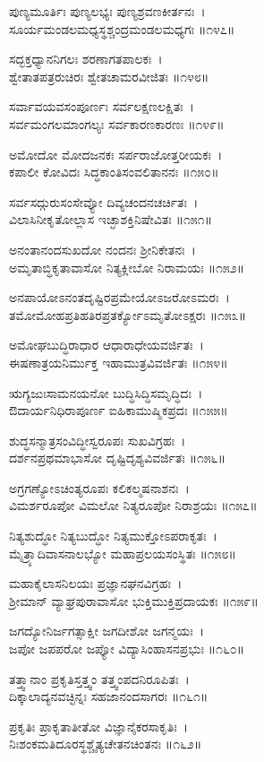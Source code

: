 ಪುಣ್ಯಮೂರ್ತಿಃ ಪುಣ್ಯಲಭ್ಯಃ ಪುಣ್ಯಶ್ರವಣಕೀರ್ತನಃ~।\\
ಸೂರ್ಯಮಂಡಲಮಧ್ಯಸ್ಥಶ್ಚಂದ್ರಮಂಡಲಮಧ್ಯಗಃ ॥೧೪೭॥

	ಸದ್ಭಕ್ತಧ್ಯಾನನಿಗಲಃ ಶರಣಾಗತಪಾಲಕಃ~।\\
	ಶ್ವೇತಾತಪತ್ರರುಚಿರಃ ಶ್ವೇತಚಾಮರವೀಜಿತಃ ॥೧೪೮॥

ಸರ್ವಾವಯವಸಂಪೂರ್ಣಃ ಸರ್ವಲಕ್ಷಣಲಕ್ಷಿತಃ~।\\
ಸರ್ವಮಂಗಲಮಾಂಗಲ್ಯಃ ಸರ್ವಕಾರಣಕಾರಣಃ ॥೧೪೯॥

	ಅಮೋದೋ ಮೋದಜನಕಃ ಸರ್ಪರಾಜೋತ್ತರೀಯಕಃ~।\\
	ಕಪಾಲೀ ಕೋವಿದಃ ಸಿದ್ಧಕಾಂತಿಸಂವಲಿತಾನನಃ ॥೧೫೦॥

ಸರ್ವಸದ್ಗುರುಸಂಸೇವ್ಯೋ ದಿವ್ಯಚಂದನಚರ್ಚಿತಃ~।\\
ವಿಲಾಸಿನೀಕೃತೋಲ್ಲಾಸ ಇಚ್ಛಾಶಕ್ತಿನಿಷೇವಿತಃ ॥೧೫೧॥

	ಅನಂತಾನಂದಸುಖದೋ ನಂದನಃ ಶ್ರೀನಿಕೇತನಃ~।\\
	ಅಮೃತಾಬ್ಧಿಕೃತಾವಾಸೋ ನಿತ್ಯಕ್ಲೀಬೋ ನಿರಾಮಯಃ ॥೧೫೨॥

ಅನಪಾಯೋಽನಂತದೃಷ್ಟಿರಪ್ರಮೇಯೋಽಜರೋಽಮರಃ~।\\
ತಮೋಮೋಹಪ್ರತಿಹತಿರಪ್ರತರ್ಕ್ಯೋಽಮೃತೋಽಕ್ಷರಃ ॥೧೫೩॥

	ಅಮೋಘಬುದ್ಧಿರಾಧಾರ ಆಧಾರಾಧೇಯವರ್ಜಿತಃ~।\\
	ಈಷಣಾತ್ರಯನಿರ್ಮುಕ್ತ ಇಹಾಮುತ್ರವಿವರ್ಜಿತಃ ॥೧೫೪॥

ಋಗ್ಯಜುಃಸಾಮನಯನೋ ಬುದ್ಧಿಸಿದ್ಧಿಸಮೃದ್ಧಿದಃ~।\\
ಔದಾರ್ಯನಿಧಿರಾಪೂರ್ಣ ಐಹಿಕಾಮುಷ್ಮಿಕಪ್ರದಃ ॥೧೫೫॥

	ಶುದ್ಧಸನ್ಮಾತ್ರಸಂವಿದ್ಧೀಸ್ವರೂಪಃ ಸುಖವಿಗ್ರಹಃ~।\\
	ದರ್ಶನಪ್ರಥಮಾಭಾಸೋ ದೃಷ್ಟಿದೃಶ್ಯವಿವರ್ಜಿತಃ ॥೧೫೬॥

ಅಗ್ರಗಣ್ಯೋಽಚಿಂತ್ಯರೂಪಃ ಕಲಿಕಲ್ಮಷನಾಶನಃ~।\\
ವಿಮರ್ಶರೂಪೋ ವಿಮಲೋ ನಿತ್ಯರೂಪೋ ನಿರಾಶ್ರಯಃ ॥೧೫೭॥

ನಿತ್ಯಶುದ್ಧೋ ನಿತ್ಯಬುದ್ಧೋ ನಿತ್ಯಮುಕ್ತೋಽಪರಾಕೃತಃ~।\\
ಮೈತ್ರ್ಯಾದಿವಾಸನಾಲಭ್ಯೋ ಮಹಾಪ್ರಲಯಸಂಸ್ಥಿತಃ ॥೧೫೮॥

ಮಹಾಕೈಲಾಸನಿಲಯಃ ಪ್ರಜ್ಞಾನಘನವಿಗ್ರಹಃ~।\\
ಶ್ರೀಮಾನ್ ವ್ಯಾಘ್ರಪುರಾವಾಸೋ ಭುಕ್ತಿಮುಕ್ತಿಪ್ರದಾಯಕಃ ॥೧೫೯॥

	ಜಗದ್ಯೋನಿರ್ಜಗತ್ಸಾಕ್ಷೀ ಜಗದೀಶೋ ಜಗನ್ಮಯಃ~।\\
	ಜಪೋ ಜಪಪರೋ ಜಪ್ಯೋ ವಿದ್ಯಾಸಿಂಹಾಸನಪ್ರಭುಃ ॥೧೬೦॥

ತತ್ತ್ವಾನಾಂ ಪ್ರಕೃತಿಸ್ತತ್ತ್ವಂ ತತ್ತ್ವಂಪದನಿರೂಪಿತಃ~।\\
ದಿಕ್ಕಾಲಾದ್ಯನವಚ್ಛಿನ್ನಃ ಸಹಜಾನಂದಸಾಗರಃ ॥೧೬೧॥

	ಪ್ರಕೃತಿಃ ಪ್ರಾಕೃತಾತೀತೋ ವಿಜ್ಞಾನೈಕರಸಾಕೃತಿಃ~।\\
	ನಿಃಶಂಕಮತಿದೂರಸ್ಥಶ್ಚೈತ್ಯಚೇತನಚಿಂತನಃ ॥೧೬೨॥

